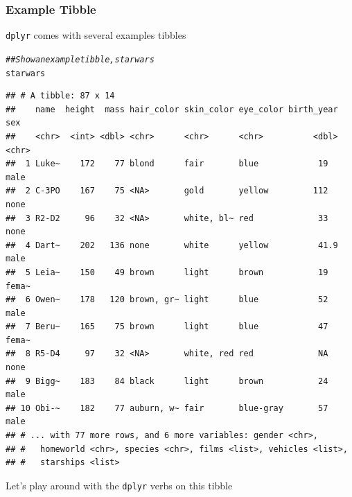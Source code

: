 \documentclass{beamer}\usepackage[]{graphicx}\usepackage[]{color}
\makeatletter
\newcommand{\hlcom}[1]{\textcolor[rgb]{0.678,0.584,0.686}{\textit{#1}}}%
\newcommand{\hlstd}[1]{\textcolor[rgb]{0.345,0.345,0.345}{#1}}%
\newenvironment{kframe}{%
 \def\at@end@of@kframe{}%
 \ifinner\ifhmode%
  \def\at@end@of@kframe{\end{minipage}}%
  \begin{minipage}{\columnwidth}%
 \fi\fi%
 \def\FrameCommand##1{\hskip\@totalleftmargin \hskip-\fboxsep
 \colorbox{shadecolor}{##1}\hskip-\fboxsep
     \hskip-\linewidth \hskip-\@totalleftmargin \hskip\columnwidth}%
 \MakeFramed {\advance\hsize-\width
   \@totalleftmargin\z@ \linewidth\hsize
   \@setminipage}}%
 {\par\unskip\endMakeFramed%
 \at@end@of@kframe}
\newenvironment{knitrout}{}{} %
\makeatother
\begin{document}
\begin{frame}[fragile]\frametitle{Example Tibble}
    \texttt{dplyr} comes with several examples tibbles
\begin{knitrout}\footnotesize
{}\color{fgcolor}\begin{kframe}
\begin{alltt}
\hlcom{## Show an example tibble, starwars}
\hlstd{starwars}
\end{alltt}
\begin{verbatim}
## # A tibble: 87 x 14
##    name  height  mass hair_color skin_color eye_color birth_year sex  
##    <chr>  <int> <dbl> <chr>      <chr>      <chr>          <dbl> <chr>
##  1 Luke~    172    77 blond      fair       blue            19   male 
##  2 C-3PO    167    75 <NA>       gold       yellow         112   none 
##  3 R2-D2     96    32 <NA>       white, bl~ red             33   none 
##  4 Dart~    202   136 none       white      yellow          41.9 male 
##  5 Leia~    150    49 brown      light      brown           19   fema~
##  6 Owen~    178   120 brown, gr~ light      blue            52   male 
##  7 Beru~    165    75 brown      light      blue            47   fema~
##  8 R5-D4     97    32 <NA>       white, red red             NA   none 
##  9 Bigg~    183    84 black      light      brown           24   male 
## 10 Obi-~    182    77 auburn, w~ fair       blue-gray       57   male 
## # ... with 77 more rows, and 6 more variables: gender <chr>,
## #   homeworld <chr>, species <chr>, films <list>, vehicles <list>,
## #   starships <list>
\end{verbatim}
\end{kframe}
\end{knitrout}
    \vspace{1ex}
    Let's play around with the \texttt{dplyr} verbs on this tibble
\end{frame}
\end{document}
